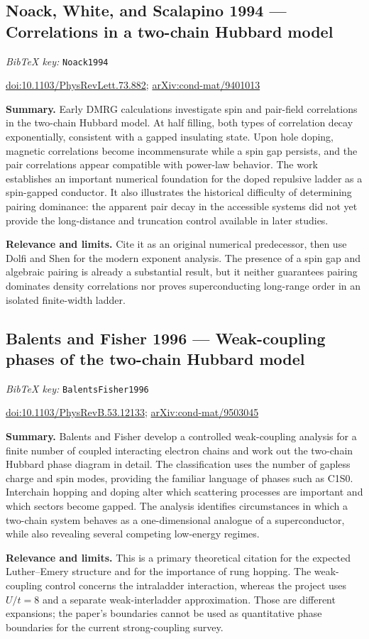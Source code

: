 \documentclass[11pt]{article}
\newcommand{\paper}[2]{\Needspace{8\baselineskip}\subsection{#2}\label{paper:#1}\textit{BibTeX key:} \texttt{#1}\quad\citep{#1}\par}
\newcommand{\doi}[1]{\href{https://doi.org/#1}{doi:#1}}
\newcommand{\arxiv}[1]{\href{https://arxiv.org/abs/#1}{arXiv:#1}}
\newcommand{\summary}{\par\textbf{Summary.} }
\newcommand{\relevance}{\par\textbf{Relevance and limits.} }
\begin{document}
\paper{Noack1994}{Noack, White, and Scalapino 1994 --- Correlations in a two-chain Hubbard model}
\doi{10.1103/PhysRevLett.73.882}; \arxiv{cond-mat/9401013}
\summary Early DMRG calculations investigate spin and pair-field correlations in the two-chain Hubbard model. At half filling, both types of correlation decay exponentially, consistent with a gapped insulating state. Upon hole doping, magnetic correlations become incommensurate while a spin gap persists, and the pair correlations appear compatible with power-law behavior. The work establishes an important numerical foundation for the doped repulsive ladder as a spin-gapped conductor. It also illustrates the historical difficulty of determining pairing dominance: the apparent pair decay in the accessible systems did not yet provide the long-distance and truncation control available in later studies.
\relevance Cite it as an original numerical predecessor, then use Dolfi and Shen for the modern exponent analysis. The presence of a spin gap and algebraic pairing is already a substantial result, but it neither guarantees pairing dominates density correlations nor proves superconducting long-range order in an isolated finite-width ladder.

\paper{BalentsFisher1996}{Balents and Fisher 1996 --- Weak-coupling phases of the two-chain Hubbard model}
\doi{10.1103/PhysRevB.53.12133}; \arxiv{cond-mat/9503045}
\summary Balents and Fisher develop a controlled weak-coupling analysis for a finite number of coupled interacting electron chains and work out the two-chain Hubbard phase diagram in detail. The classification uses the number of gapless charge and spin modes, providing the familiar language of phases such as C1S0. Interchain hopping and doping alter which scattering processes are important and which sectors become gapped. The analysis identifies circumstances in which a two-chain system behaves as a one-dimensional analogue of a superconductor, while also revealing several competing low-energy regimes.
\relevance This is a primary theoretical citation for the expected Luther--Emery structure and for the importance of rung hopping. The weak-coupling control concerns the intraladder interaction, whereas the project uses $U/t=8$ and a separate weak-interladder approximation. Those are different expansions; the paper's boundaries cannot be used as quantitative phase boundaries for the current strong-coupling survey.
\end{document}
